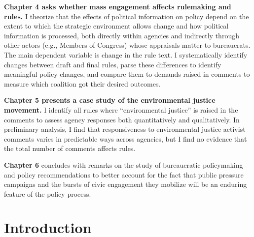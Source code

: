 \documentclass[
      12pt,
        ]{article}
\begin{document}
\textbf{Chapter 4 asks whether mass engagement affects rulemaking and rules.}
I theorize that the effects of political information on policy depend on the extent to which the strategic environment allows change and how political information is processed, both directly within agencies and indirectly through other actors (e.g., Members of Congress) whose appraisals matter to bureaucrats.
The main dependent variable is change in the rule text.
I systematically identify changes between draft and final rules, parse these differences to identify meaningful policy changes, and compare them to demands raised in comments to measure which coalition got their desired outcomes.

\textbf{Chapter 5 presents a case study of the environmental justice movement.} I identify all rules where ``environmental justice'' is raised in the comments to assess agency responses both quantitatively and qualitatively. In preliminary analysis, I find that responsiveness to environmental justice activist comments varies in predictable ways across agencies, but I find no evidence that the total number of comments affects rules.

\textbf{Chapter 6} concludes with remarks on the study of bureaucratic policymaking and policy recommendations to better account for the fact that public pressure campaigns and the bursts of civic engagement they mobilize will be an enduring feature of the policy process.

\hypertarget{intro}{%
\section{Introduction}\label{intro}}
\end{document}
